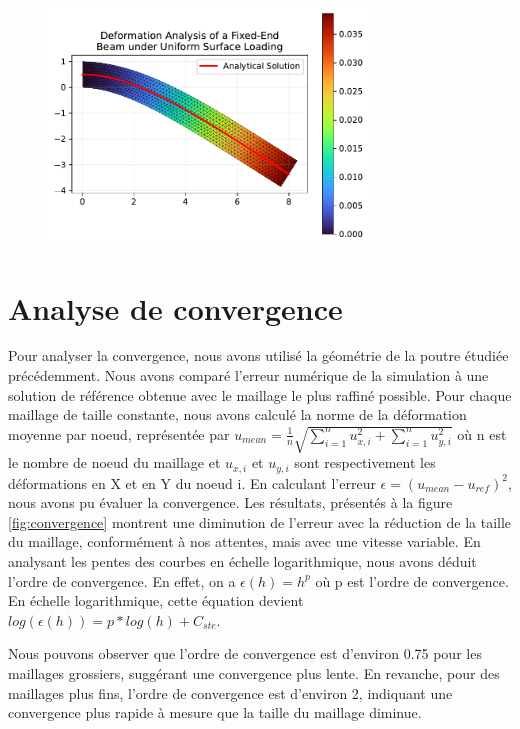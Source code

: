 \documentclass[conference]{IEEEtran}
\begin{document}
\begin{figure}[!htb]
    \centering
    \includegraphics[width=8.5cm]{Figures/poutre_validation_code.pdf}
    \label{fig:validationCode_Beam}
\end{figure}

\section{Analyse de convergence}


Pour analyser la convergence, nous avons utilisé la géométrie de la poutre étudiée précédemment. Nous avons comparé l'erreur numérique de la simulation à une solution de référence obtenue avec le maillage le plus raffiné possible. Pour chaque maillage de taille constante, nous avons calculé la norme de la déformation moyenne par noeud, représentée par $u_{mean} = \frac{1}{n} \sqrt{\sum\limits_{i=1}^{n} u_{x,i}^{2} + \sum\limits_{i=1}^{n} u_{y,i}^2}$ où n est le nombre de noeud du maillage et $u_{x,i}$ et $u_{y,i}$ sont respectivement les déformations en X et en Y du noeud i. En calculant l'erreur $\epsilon = (u_{mean} - u_{ref})^2$, nous avons pu évaluer la convergence. Les résultats, présentés à la figure \ref{fig:convergence} montrent une diminution de l'erreur avec la réduction de la taille du maillage, conformément à nos attentes, mais avec une vitesse variable.
En analysant les pentes des courbes en échelle logarithmique, nous avons déduit l'ordre de convergence. En effet, on a $\epsilon(h) = h^p$ où p est l'ordre de convergence. En échelle logarithmique, cette équation devient $log(\epsilon(h)) = p * log(h) + C_{ste}$.

Nous pouvons observer que l'ordre de convergence est d'environ 0.75 pour les maillages grossiers, suggérant une convergence plus lente. En revanche, pour des maillages plus fins, l'ordre de convergence est d'environ 2, indiquant une convergence plus rapide à mesure que la taille du maillage diminue.
\end{document}
